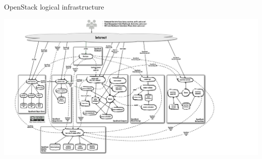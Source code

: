 \begin{frame}{OpenStack logical infrastructure}
  \begin{center}
    \includegraphics[width=38em]{img/openstack-arch-havana-logical-v1}
  \end{center}
\end{frame}


